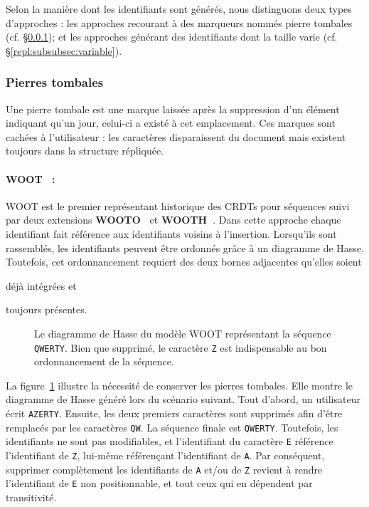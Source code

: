 Selon la manière dont les identifiants sont générés, nous distinguons deux types
d'approches : les approches recourant à des marqueurs nommés \og pierre tombales
\fg (cf. §\ref{repl:subsubsec:tombstones}); et les approches générant des
identifiants dont la taille varie (cf. §\ref{repl:subsubsec:variable}).

\subsubsection{Pierres tombales}
\label{repl:subsubsec:tombstones}

Une \og pierre tombale \fg est une marque laissée après la suppression d'un
élément indiquant qu'un jour, celui-ci a existé à cet emplacement. Ces marques
sont cachées à l'utilisateur : les caractères disparaissent du document mais
existent toujours dans la structure répliquée.


\paragraph{WOOT~\cite{oster2006data} :} WOOT est le premier représentant
historique des CRDTs pour séquences suivi par deux extensions
\textbf{WOOTO~\cite{weiss2007wooki}} et
\textbf{WOOTH~\cite{ahmed2011evaluating}}. Dans cette approche chaque
identifiant fait référence aux identifiants voisins à l'insertion.  Lorsqu'ils
sont rassemblés, les identifiants peuvent être ordonnés grâce à un diagramme de
Hasse. Toutefois, cet ordonnancement requiert des deux bornes adjacentes
qu'elles soient
\begin{inparaenum}[(i)]
\item déjà intégrées et
\item toujours présentes.
\end{inparaenum}


\begin{figure}
  \centering
  
  \caption[Diagramme de Hasse dans WOOT]
  {\label{repl:fig:wootexample}Le diagramme de Hasse du modèle WOOT représentant
    la séquence \texttt{QWERTY}. Bien que supprimé, le caractère \texttt{Z} est
    indispensable au bon ordonnancement de la séquence.}
\end{figure}

\noindent La figure~\ref{repl:fig:wootexample} illustre la nécessité de
conserver les pierres tombales. Elle montre le diagramme de Hasse généré lors du
scénario suivant. Tout d'abord, un utilisateur écrit \texttt{AZERTY}. Ensuite,
les deux premiers caractères sont supprimés afin d'être remplacés par les
caractères \texttt{QW}. La séquence finale est \texttt{QWERTY}. Toutefois, les
identifiants ne sont pas modifiables, et l'identifiant du caractère \texttt{E}
référence l'identifiant de \texttt{Z}, lui-même référençant l'identifiant de
\texttt{A}. Par conséquent, supprimer complètement les identifiants de
\texttt{A} et/ou de \texttt{Z} revient à rendre l'identifiant de \texttt{E} non
positionnable, et tout ceux qui en dépendent par transitivité.

